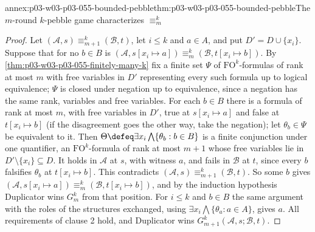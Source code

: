\begin{annexitem}{annex:p03-w03-p03-055-bounded-pebble}{thm:p03-w03-p03-055-bounded-pebble}{The \(m\)-round \(k\)-pebble game characterizes \(\equiv^k_m\)}
\begin{proof}
Let \((\mathcal A,s)\equiv^k_{m+1}(\mathcal B,t)\), let \(i\le k\) and
\(a\in A\), and put \(D'=D\cup\{x_i\}\). Suppose that for no \(b\in B\) is
\((\mathcal A,s[x_i\mapsto a])\equiv^k_m(\mathcal B,t[x_i\mapsto b])\). By
\cref{thm:p03-w03-p03-055-finitely-many-k} fix a finite set \(\Psi\) of
\(\mathrm{FO}^k\)-formulas of rank at most \(m\) with free variables in
\(D'\) representing every such formula up to logical equivalence; \(\Psi\)
is closed under negation up to equivalence, since a negation has the same
rank, variables and free variables. For each \(b\in B\) there is a formula
of rank at most \(m\), with free variables in \(D'\), true at
\(s[x_i\mapsto a]\) and false at \(t[x_i\mapsto b]\) (if the disagreement goes
the other way, take the negation); let \(\theta_b\in\Psi\) be equivalent to
it. Then \(\Theta\defeq\exists x_i\bigwedge\{\theta_b:b\in B\}\) is a finite
conjunction under one quantifier, an \(\mathrm{FO}^k\)-formula of rank at most
\(m+1\) whose free variables lie in \(D'\setminus\{x_i\}\subseteq D\). It
holds in \(\mathcal A\) at \(s\), with witness \(a\), and fails in
\(\mathcal B\) at \(t\), since every \(b\) falsifies \(\theta_b\) at
\(t[x_i\mapsto b]\). This contradicts
\((\mathcal A,s)\equiv^k_{m+1}(\mathcal B,t)\). So some \(b\) gives
\((\mathcal A,s[x_i\mapsto a])\equiv^k_m(\mathcal B,t[x_i\mapsto b])\), and by
the induction hypothesis Duplicator wins \(G^k_m\) from that position. For
\(i\le k\) and \(b\in B\) the same argument with the roles of the
structures exchanged, using \(\exists x_i\bigwedge\{\theta_a:a\in A\}\),
gives \(a\). All requirements of clause 2 hold, and Duplicator wins
\(G^k_{m+1}(\mathcal A,s;\mathcal B,t)\).
\end{proof}
\end{annexitem}

